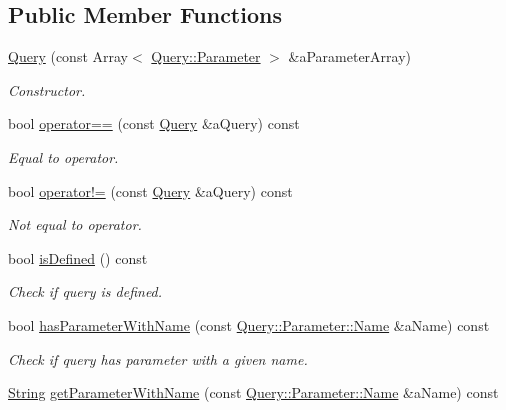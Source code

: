 \subsection*{Public Member Functions}
\begin{DoxyCompactItemize}
\item 
\hyperlink{classlibrary_1_1io_1_1url_1_1_query_a6781de8f7b7251f8e17c191434b08039}{Query} (const Array$<$ \hyperlink{classlibrary_1_1io_1_1url_1_1_query_1_1_parameter}{Query\+::\+Parameter} $>$ \&a\+Parameter\+Array)
\begin{DoxyCompactList}\small\item\em Constructor. \end{DoxyCompactList}\item 
bool \hyperlink{classlibrary_1_1io_1_1url_1_1_query_a7aa536f75df48e4ff7be3369d7f314ec}{operator==} (const \hyperlink{classlibrary_1_1io_1_1url_1_1_query}{Query} \&a\+Query) const
\begin{DoxyCompactList}\small\item\em Equal to operator. \end{DoxyCompactList}\item 
bool \hyperlink{classlibrary_1_1io_1_1url_1_1_query_a9dbb8fd3e8063c752db6fdd62673eac3}{operator!=} (const \hyperlink{classlibrary_1_1io_1_1url_1_1_query}{Query} \&a\+Query) const
\begin{DoxyCompactList}\small\item\em Not equal to operator. \end{DoxyCompactList}\item 
bool \hyperlink{classlibrary_1_1io_1_1url_1_1_query_a2f7f9b16e407735269d8e97f12ef9a8b}{is\+Defined} () const
\begin{DoxyCompactList}\small\item\em Check if query is defined. \end{DoxyCompactList}\item 
bool \hyperlink{classlibrary_1_1io_1_1url_1_1_query_a19b51e7e6dca5e76284ddf5b62dd4f7f}{has\+Parameter\+With\+Name} (const \hyperlink{classlibrary_1_1io_1_1url_1_1_query_1_1_parameter_a7edf5fb8a4ae57aed1ce5dfa2405c981}{Query\+::\+Parameter\+::\+Name} \&a\+Name) const
\begin{DoxyCompactList}\small\item\em Check if query has parameter with a given name. \end{DoxyCompactList}\item 
\hyperlink{namespacelibrary_1_1io_a7469b45835a4421045db344d6a5a1f85}{String} \hyperlink{classlibrary_1_1io_1_1url_1_1_query_a5d279ba3f21372fb4768d32a74492b85}{get\+Parameter\+With\+Name} (const \hyperlink{classlibrary_1_1io_1_1url_1_1_query_1_1_parameter_a7edf5fb8a4ae57aed1ce5dfa2405c981}{Query\+::\+Parameter\+::\+Name} \&a\+Name) const

\end{DoxyCompactItemize}
